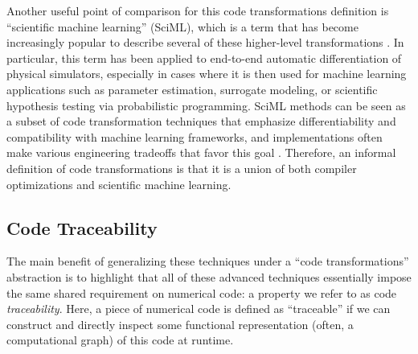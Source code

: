 Another useful point of comparison for this code transformations definition is ``scientific machine learning'' (SciML), which is a term that has become increasingly popular to describe several of these higher-level transformations \cite{ma_modelingtoolkit_2021, hu_taichi_2018, lavin_simulation_2022}. In particular, this term has been applied to end-to-end automatic differentiation of physical simulators, especially in cases where it is then used for machine learning applications such as parameter estimation, surrogate modeling, or scientific hypothesis testing via probabilistic programming. SciML methods can be seen as a subset of code transformation techniques that emphasize differentiability and compatibility with machine learning frameworks, and implementations often make various engineering tradeoffs that favor this goal \cite{rackauckas_engineering_2021}. Therefore, an informal definition of code transformations is that it is a union of both compiler optimizations and scientific machine learning.



\subsection{Code Traceability}
\label{sec:traceability}

The main benefit of generalizing these techniques under a ``code transformations'' abstraction is to highlight that all of these advanced techniques essentially impose the same shared requirement on numerical code: a property we refer to as code \emph{traceability}. Here, a piece of numerical code is defined as ``traceable'' if we can construct and directly inspect some functional representation (often, a computational graph) of this code at runtime.

